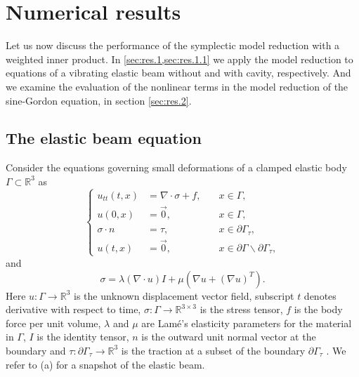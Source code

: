 \section{Numerical results} \label{sec:res}
Let us now discuss the performance of the symplectic model reduction with a weighted inner product. In \cref{sec:res.1,sec:res.1.1} we apply the model reduction to equations of a vibrating elastic beam without and with cavity, respectively. And we examine the evaluation of the nonlinear terms in the model reduction of the sine-Gordon equation, in section \cref{sec:res.2}.

\subsection{The elastic beam equation} \label{sec:res.1}
Consider the equations governing small deformations of a clamped elastic body $\Gamma\subset \mathbb R^{3}$ as 
\begin{equation} \label{eq:res.1}
\left\{
\begin{aligned}
	u_{tt}(t,x) &= \nabla \cdot \sigma + f, \quad & x\in \Gamma, \\
	u(0,x) &= \vec 0, & x\in \Gamma,\\
	\sigma \cdot n &= \tau, & x \in \partial \Gamma_\tau,\\
	u(t,x) &= \vec 0, & x \in\partial \Gamma \backslash \partial \Gamma_\tau,
\end{aligned}
\right.
\end{equation}
and
\begin{equation}  \label{eq:res.2}
	\sigma = \lambda (\nabla \cdot u) I + \mu(\nabla u + (\nabla u)^T).
\end{equation}
Here $u:\Gamma \to \mathbb{R}^3$ is the unknown displacement vector field, subscript $t$ denotes derivative with respect to time, $\sigma:\Gamma \to \mathbb{R}^{3\times 3}$ is the stress tensor, $f$ is the body force per unit volume, $\lambda$ and $\mu$ are Lam\'e's elasticity parameters for the material in $\Gamma$, $I$ is the identity tensor, $n$ is the outward unit normal vector at the boundary and $\tau:\partial \Gamma_\tau \to \mathbb R^3$ is the traction at a subset of the boundary $\partial \Gamma_\tau$ \cite{langtangen2017solving}. We refer to (a) for a snapshot of the elastic beam.

